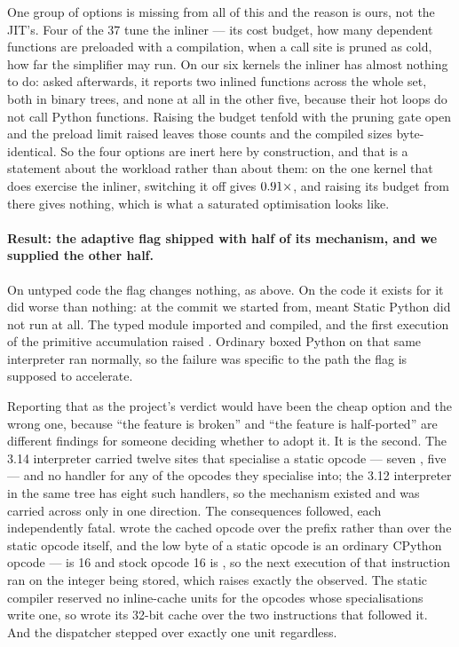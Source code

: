 One group of options is missing from all of this and the reason is ours, not the JIT's. Four of
the 37 tune the inliner --- its cost budget, how many dependent functions are preloaded with a
compilation, when a call site is pruned as cold, how far the simplifier may run. On our six
kernels the inliner has almost nothing to do: asked afterwards, it reports two inlined functions
across the whole set, both in binary trees, and none at all in the other five, because their hot
loops do not call Python functions. Raising the budget tenfold with the pruning gate open and
the preload limit raised leaves those counts and the compiled sizes byte-identical. So the four
options are inert here by construction, and that is a statement about the workload rather than
about them: on the one kernel that does exercise the inliner, switching it off gives
$\meas{ratio:b6_cinderx-jitopt_default:binarytrees/jitopt_default|b6_cinderx-jitopt_no_inliner:binarytrees/jitopt_no_inliner}{0.91}\times$, and raising its budget from there gives nothing, which is what a saturated
optimisation looks like.

\paragraph{Result: the adaptive flag shipped with half of its mechanism, and we supplied the
other half.} On untyped code the flag changes nothing, as above. On the code it exists for it
did worse than nothing: at the commit we started from, 
meant Static Python did not run at all. The typed module imported and compiled, and the first
execution of the primitive accumulation  raised
. Ordinary boxed Python on that same interpreter
ran normally, so the failure was specific to the path the flag is supposed to accelerate.

Reporting that as the project's verdict would have been the cheap option and the wrong one,
because ``the feature is broken'' and ``the feature is half-ported'' are different findings for
someone deciding whether to adopt it. It is the second. The 3.14 interpreter carried twelve
sites that specialise a static opcode --- seven , five
 --- and no handler for any of the opcodes they specialise into;
the 3.12 interpreter in the same tree has eight such handlers, so the mechanism existed and was
carried across only in one direction. The consequences followed, each independently fatal.
 wrote the cached opcode over the  prefix rather
than over the static opcode itself, and the low byte of a static opcode is an ordinary CPython
opcode ---  is 16 and stock opcode 16 is , so the
next execution of that instruction ran  on the integer being stored, which raises
exactly the  observed. The static compiler reserved no inline-cache units for
the opcodes whose specialisations write one, so  wrote its 32-bit cache over the two
instructions that followed it. And the dispatcher stepped over exactly one unit regardless.

